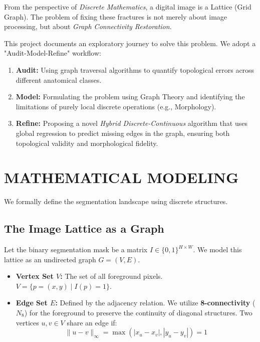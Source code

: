 \documentclass[twocolumn, 10pt, a4paper]{article}
\begin{document}
From the perspective of \textit{Discrete Mathematics}, a digital image is a Lattice (Grid Graph). The problem of fixing these fractures is not merely about image processing, but about \textit{Graph Connectivity Restoration}. 

This project documents an exploratory journey to solve this problem. We adopt a "Audit-Model-Refine" workflow:
\begin{enumerate}
    \item \textbf{Audit:} Using graph traversal algorithms to quantify topological errors across different anatomical classes.
    \item \textbf{Model:} Formulating the problem using Graph Theory and identifying the limitations of purely local discrete operations (e.g., Morphology).
    \item \textbf{Refine:} Proposing a novel \textit{Hybrid Discrete-Continuous} algorithm that uses global regression to predict missing edges in the graph, ensuring both topological validity and morphological fidelity.
\end{enumerate}

\section{MATHEMATICAL MODELING}
We formally define the segmentation landscape using discrete structures.

\subsection{The Image Lattice as a Graph}
Let the binary segmentation mask be a matrix $I \in \{0, 1\}^{H \times W}$. We model this lattice as an undirected graph $G = (V, E)$.
\begin{itemize}
    \item \textbf{Vertex Set $V$:} The set of all foreground pixels.
    $V = \{ p=(x, y) \mid I(p) = 1 \}$.
    \item \textbf{Edge Set $E$:} Defined by the adjacency relation. We utilize \textbf{8-connectivity} ($N_8$) for the foreground to preserve the continuity of diagonal structures. Two vertices $u, v \in V$ share an edge if:
    \begin{equation}
        \| u - v \|_\infty = \max(|x_u - x_v|, |y_u - y_v|) = 1
    \end{equation}
\end{itemize}
\end{document}
